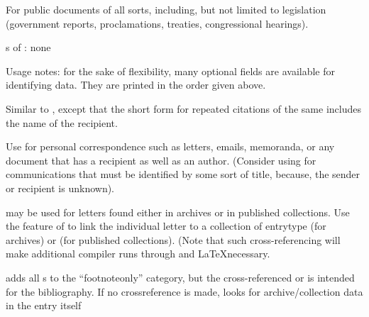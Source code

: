 \documentclass{ltxdockit}[2010/02/12]
\begin{document}
\begin{typelist}




For public documents of all sorts, including, but not limited to legislation (\eg government reports, proclamations, treaties, congressional hearings).


s of : none




Usage notes: for the sake of flexibility, many optional fields are available for identifying data. They are printed in the order given above.



Similar to , except that the short form for repeated citations of the same  includes the name of the recipient.

Use for personal correspondence such as letters, emails, memoranda, or any document that has a recipient as well as an author. (Consider using  for communications that must be identified by some sort of title, because, \eg the sender or recipient is unknown). 

 may be used for letters found either in archives or in published collections. Use the  feature of to link the individual letter to a collection of entrytype  (for archives) or  (for published collections).  (Note that such cross-referencing will make additional compiler runs through  and \LaTeX necessary.

 adds all s  to the ``footnoteonly'' category, but the cross-referenced  or  is intended for the bibliography. If no crossreference is made,  looks for archive/collection data in the  entry itself



\end{typelist}
\end{document}
